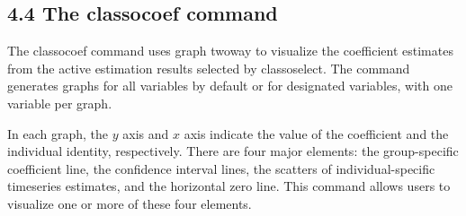 \documentclass[10pt]{article}
\begin{document}
\subsection*{4.4 The classocoef command}
The classocoef command uses graph twoway to visualize the coefficient estimates from the active estimation results selected by classoselect. The command generates graphs for all variables by default or for designated variables, with one variable per graph.

In each graph, the $y$ axis and $x$ axis indicate the value of the coefficient and the individual identity, respectively. There are four major elements: the group-specific coefficient line, the confidence interval lines, the scatters of individual-specific timeseries estimates, and the horizontal zero line. This command allows users to visualize one or more of these four elements.
\end{document}

